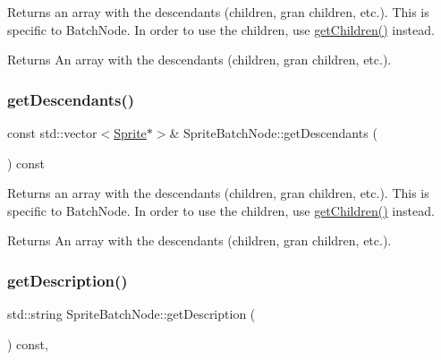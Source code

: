 Returns an array with the descendants (children, gran children, etc.). This is specific to Batch\+Node. In order to use the children, use \hyperlink{classNode_a25943a94b19e37929b18f93647b58153}{get\+Children()} instead.

\begin{DoxyReturn}{Returns}
An array with the descendants (children, gran children, etc.). 
\end{DoxyReturn}
\mbox{\label{classSpriteBatchNode_adcf146809bbf5d09e2228cf1cff65e06}} 
\subsubsection{\texorpdfstring{get\+Descendants()}{getDescendants()}\hspace{0.1cm}{\footnotesize\ttfamily [2/2]}}
{\footnotesize\ttfamily const std\+::vector$<$\hyperlink{classSprite}{Sprite}$\ast$$>$\& Sprite\+Batch\+Node\+::get\+Descendants (\begin{DoxyParamCaption}{ }\end{DoxyParamCaption}) const\hspace{0.3cm}{\ttfamily [inline]}}

Returns an array with the descendants (children, gran children, etc.). This is specific to Batch\+Node. In order to use the children, use \hyperlink{classNode_a25943a94b19e37929b18f93647b58153}{get\+Children()} instead.

\begin{DoxyReturn}{Returns}
An array with the descendants (children, gran children, etc.). 
\end{DoxyReturn}
\mbox{\label{classSpriteBatchNode_abaf755bc79646464f59b68b5a4fdc68c}} 
\subsubsection{\texorpdfstring{get\+Description()}{getDescription()}\hspace{0.1cm}{\footnotesize\ttfamily [1/2]}}
{\footnotesize\ttfamily std\+::string Sprite\+Batch\+Node\+::get\+Description (\begin{DoxyParamCaption}{ }\end{DoxyParamCaption}) const\hspace{0.3cm}{\ttfamily [override]}, {\ttfamily [virtual]}}

